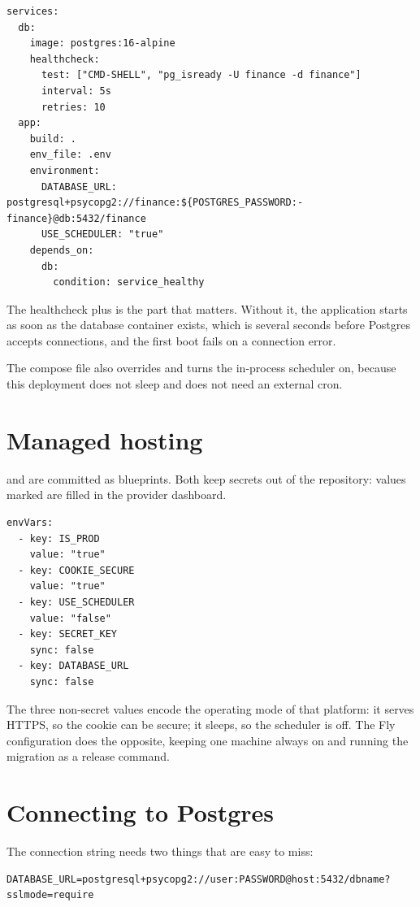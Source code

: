 \begin{lstlisting}[style=sh]
services:
  db:
    image: postgres:16-alpine
    healthcheck:
      test: ["CMD-SHELL", "pg_isready -U finance -d finance"]
      interval: 5s
      retries: 10
  app:
    build: .
    env_file: .env
    environment:
      DATABASE_URL: postgresql+psycopg2://finance:${POSTGRES_PASSWORD:-finance}@db:5432/finance
      USE_SCHEDULER: "true"
    depends_on:
      db:
        condition: service_healthy
\end{lstlisting}

The healthcheck plus  is the part that matters.
Without it, the application starts as soon as the database container exists,
which is several seconds before Postgres accepts connections, and the first boot
fails on a connection error.

The compose file also overrides  and turns the in-process
scheduler on, because this deployment does not sleep and does not need an
external cron.

\section{Managed hosting}

 and  are committed as blueprints. Both keep
secrets out of the repository: values marked  are filled in
the provider dashboard.

\begin{lstlisting}[style=sh]
envVars:
  - key: IS_PROD
    value: "true"
  - key: COOKIE_SECURE
    value: "true"
  - key: USE_SCHEDULER
    value: "false"
  - key: SECRET_KEY
    sync: false
  - key: DATABASE_URL
    sync: false
\end{lstlisting}

The three non-secret values encode the operating mode of that platform: it
serves HTTPS, so the cookie can be secure; it sleeps, so the scheduler is off.
The Fly configuration does the opposite, keeping one machine always on and
running the migration as a release command.

\section{Connecting to Postgres}

The connection string needs two things that are easy to miss:

\begin{lstlisting}[style=sh]
DATABASE_URL=postgresql+psycopg2://user:PASSWORD@host:5432/dbname?sslmode=require
\end{lstlisting}

